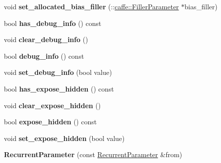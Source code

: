 \begin{DoxyCompactItemize}
void {\bfseries set\+\_\+allocated\+\_\+bias\+\_\+filler} (\+::\mbox{\hyperlink{classcaffe_1_1_filler_parameter}{caffe\+::\+Filler\+Parameter}} $\ast$bias\+\_\+filler)
\item 
\mbox{\label{classcaffe_1_1_recurrent_parameter_a93c3e87a394cc21e9b2f538a7e74315d}} 
bool {\bfseries has\+\_\+debug\+\_\+info} () const
\item 
\mbox{\label{classcaffe_1_1_recurrent_parameter_a306de4d0dac1a9c86e0c64a102656e8a}} 
void {\bfseries clear\+\_\+debug\+\_\+info} ()
\item 
\mbox{\label{classcaffe_1_1_recurrent_parameter_a903981bec3bce564e4aa1b50f359683f}} 
bool {\bfseries debug\+\_\+info} () const
\item 
\mbox{\label{classcaffe_1_1_recurrent_parameter_a24160f6457c53df5948cb071dadc5c1e}} 
void {\bfseries set\+\_\+debug\+\_\+info} (bool value)
\item 
\mbox{\label{classcaffe_1_1_recurrent_parameter_a97d4255b6b5e83b861db4ff2594b688f}} 
bool {\bfseries has\+\_\+expose\+\_\+hidden} () const
\item 
\mbox{\label{classcaffe_1_1_recurrent_parameter_a9609e9091d135b68605449e9beba17b9}} 
void {\bfseries clear\+\_\+expose\+\_\+hidden} ()
\item 
\mbox{\label{classcaffe_1_1_recurrent_parameter_aec343ef3ec7731534f53b4151ed6ab1a}} 
bool {\bfseries expose\+\_\+hidden} () const
\item 
\mbox{\label{classcaffe_1_1_recurrent_parameter_a589979dd39efd4b02aba827a59e5030e}} 
void {\bfseries set\+\_\+expose\+\_\+hidden} (bool value)
\item 
\mbox{\label{classcaffe_1_1_recurrent_parameter_ab226fa428771eb1493ae8e61aba47b3c}} 
{\bfseries Recurrent\+Parameter} (const \mbox{\hyperlink{classcaffe_1_1_recurrent_parameter}{Recurrent\+Parameter}} \&from)

\end{DoxyCompactItemize}
